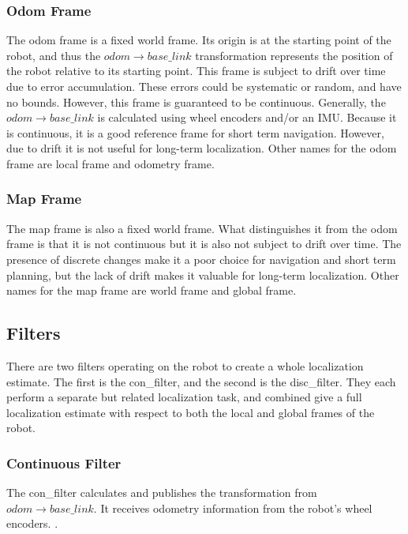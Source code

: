 \documentclass[thesis.tex]{subfile}
\begin{document}
\subsubsection{Odom Frame}
The odom frame is a fixed world frame. Its origin is at the starting point of the robot, and thus the $odom \rightarrow base\_link$ transformation represents the position of the robot relative to its starting point. This frame is subject to drift over time due to error accumulation. These errors could be systematic or random, and have no bounds. However, this frame is guaranteed to be continuous. Generally, the $odom \rightarrow base\_link$ is calculated using wheel encoders and/or an IMU. Because it is continuous, it is a good reference frame for short term navigation. However, due to drift it is not useful for long-term localization. Other names for the odom frame are local frame and odometry frame.

\subsubsection{Map Frame}
The map frame is also a fixed world frame. What distinguishes it from the odom frame is that it is not continuous but it is also not subject to drift over time. The presence of discrete changes make it a poor choice for navigation and short term planning, but the lack of drift makes it valuable for long-term localization. Other names for the map frame are world frame and global frame.
 
\subsection{Filters}
There are two filters operating on the robot to create a whole localization estimate. The first is the \gls{con_filter}, and the second is the \gls{disc_filter}. They each perform a separate but related localization task, and combined give a full localization estimate with respect to both the local and global frames of the robot. 

\subsubsection{Continuous Filter} \label{con_filter_subsubsection}
The \gls{con_filter} calculates and publishes the transformation from $odom \rightarrow base\_link$. It receives odometry information from the robot's wheel encoders. %
.
\end{document}
